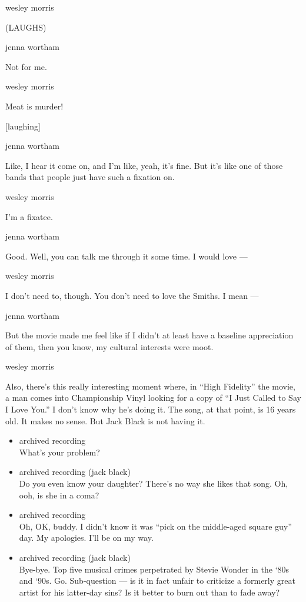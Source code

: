 wesley morris

(LAUGHS)

jenna wortham

Not for me.

wesley morris

Meat is murder!

{[}laughing{]}

jenna wortham

Like, I hear it come on, and I'm like, yeah, it's fine. But it's like
one of those bands that people just have such a fixation on.

wesley morris

I'm a fixatee.

jenna wortham

Good. Well, you can talk me through it some time. I would love ---

wesley morris

I don't need to, though. You don't need to love the Smiths. I mean ---

jenna wortham

But the movie made me feel like if I didn't at least have a baseline
appreciation of them, then you know, my cultural interests were moot.

wesley morris

Also, there's this really interesting moment where, in ``High Fidelity''
the movie, a man comes into Championship Vinyl looking for a copy of ``I
Just Called to Say I Love You.'' I don't know why he's doing it. The
song, at that point, is 16 years old. It makes no sense. But Jack Black
is not having it.

\begin{itemize}
\item
  archived recording\\
  What's your problem?
\item
  archived recording (jack black)\\
  Do you even know your daughter? There's no way she likes that song.
  Oh, ooh, is she in a coma?
\item
  archived recording\\
  Oh, OK, buddy. I didn't know it was ``pick on the middle-aged square
  guy'' day. My apologies. I'll be on my way.
\item
  archived recording (jack black)\\
  Bye-bye. Top five musical crimes perpetrated by Stevie Wonder in the
  `80s and `90s. Go. Sub-question --- is it in fact unfair to criticize
  a formerly great artist for his latter-day sins? Is it better to burn
  out than to fade away?
\end{itemize}

